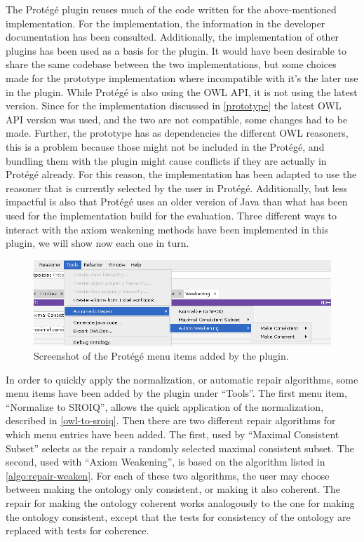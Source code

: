 
The Protégé plugin reuses much of the code written for the above-mentioned implementation. For the implementation, the information in the developer documentation \cite{protege5devdocs} has been consulted. Additionally, the implementation of other plugins \cite{ontodebug,protegepluginexamples} has been used as a basis for the plugin. It would have been desirable to share the same codebase between the two implementations, but some choices made for the prototype implementation where incompatible with it's the later use in the plugin. While Protégé is also using the OWL API, it is not using the latest version. Since for the implementation discussed in \cref{prototype} the latest OWL API version was used, and the two are not compatible, some changes had to be made. Further, the prototype has as dependencies the different OWL reasoners, this is a problem because those might not be included in the Protégé, and bundling them with the plugin might cause conflicts if they are actually in Protégé already. For this reason, the implementation has been adapted to use the reasoner that is currently selected by the user in Protégé. Additionally, but less impactful is also that Protégé uses an older version of Java than what has been used for the implementation build for the evaluation. Three different ways to interact with the axiom weakening methods have been implemented in this plugin, we will show now each one in turn.

\begin{figure}[ht]
  \centering
  \includegraphics[width=\textwidth]{resources/protege-menu.png}
  \caption{Screenshot of the Protégé menu items added by the plugin.}
  \label{fig:protege-menu}
\end{figure}

In order to quickly apply the normalization, or automatic repair algorithms, some menu items have been added by the plugin under ``Tools''. The first menu item, ``Normalize to SROIQ'', allows the quick application of the normalization, described in \cref{owl-to-sroiq}. Then there are two different repair algorithms for which menu entries have been added. The first, used by ``Maximal Consistent Subset'' selects as the repair a randomly selected maximal consistent subset. The second, used with ``Axiom Weakening'', is based on the algorithm listed in \cref{algo:repair-weaken}. For each of these two algorithms, the user may choose between making the ontology only consistent, or making it also coherent. The repair for making the ontology coherent works analogously to the one for making the ontology consistent, except that the tests for consistency of the ontology are replaced with tests for coherence.

